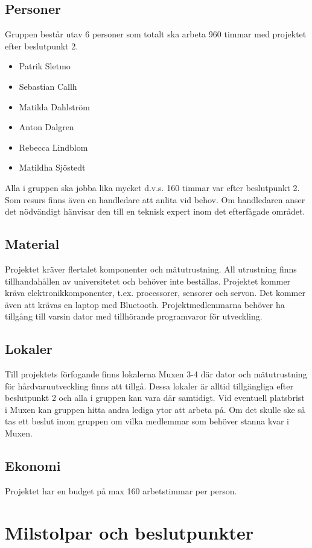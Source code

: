 \documentclass{article}
\begin{document}
\subsection{Personer}
Gruppen består utav 6 personer som totalt ska arbeta 960 timmar med projektet efter beslutpunkt 2.
\begin{itemize}
  \item Patrik Sletmo
  \item Sebastian Callh
  \item Matilda Dahlström
  \item Anton Dalgren
  \item Rebecca Lindblom
  \item Matildha Sjöstedt
\end{itemize}
Alla i gruppen ska jobba lika mycket d.v.s. 160 timmar var efter beslutpunkt 2.
\newline\newline
Som resurs finns även en handledare att anlita vid behov. Om handledaren anser det nödvändigt hänvisar den till en teknisk expert inom det efterfågade området. 
\subsection{Material}
Projektet kräver flertalet komponenter och mätutrustning. All utrustning finns tillhandahållen av universitetet och behöver inte beställas. Projektet kommer kräva elektronikkomponenter, t.ex. processorer, sensorer och servon. Det kommer även att krävas en laptop med Bluetooth. Projektmedlemmarna behöver ha tillgång till varsin dator med tillhörande programvaror för utveckling.   
\subsection{Lokaler}
Till projektets förfogande finns lokalerna Muxen 3-4 där dator och mätutrustning för hårdvaruutveckling finns att tillgå. Dessa lokaler är alltid tillgängliga efter beslutpunkt 2 och alla i gruppen kan vara där samtidigt. Vid eventuell platsbrist i Muxen kan gruppen hitta andra lediga ytor att arbeta på. Om det skulle ske så tas ett beslut inom gruppen om vilka medlemmar som behöver stanna kvar i Muxen.
\subsection{Ekonomi}
Projektet har en budget på max 160 arbetstimmar per person.

\section{Milstolpar och beslutpunkter}
\end{document}

